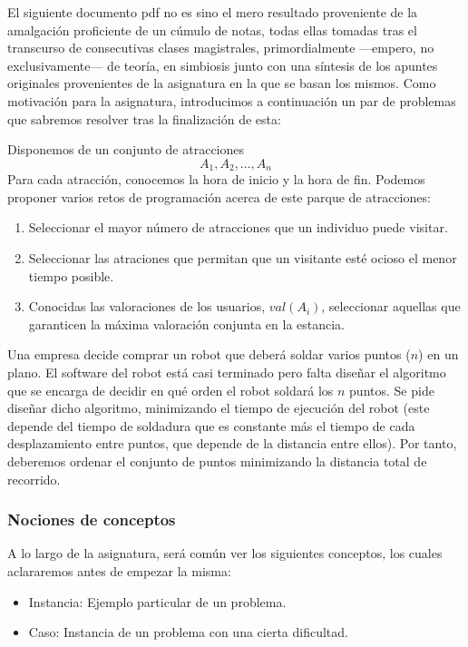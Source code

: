 El siguiente documento pdf no es sino el mero resultado proveniente de la amalgación proficiente de un cúmulo de notas, todas ellas tomadas tras el transcurso de consecutivas clases magistrales, primordialmente —empero, no exclusivamente— de teoría, en simbiosis junto con una síntesis de los apuntes originales provenientes de la asignatura en la que se basan los mismos.
Como motivación para la asignatura, introducimos a continuación un par de problemas que sabremos resolver tras la finalización de esta:

\begin{ejercicio*}
Disponemos de un conjunto de atracciones 
\[
A_1, A_2, \ldots, A_n
\]
Para cada atracción, conocemos la hora de inicio y la hora de fin. Podemos proponer varios retos de programación acerca de este parque de atracciones:
\begin{enumerate}
    \item Seleccionar el mayor número de atracciones que un individuo puede visitar.
    \item Seleccionar las atraciones que permitan que un visitante esté ocioso el menor tiempo posible.
    \item Conocidas las valoraciones de los usuarios, $val(A_i)$, seleccionar aquellas que garanticen la máxima valoración conjunta en la estancia.
\end{enumerate}
\end{ejercicio*}

\begin{ejercicio*}
Una empresa decide comprar un robot que deberá soldar varios puntos ($n$) en un plano. El software del robot está casi terminado pero falta diseñar el algoritmo que se encarga de decidir en qué orden el robot soldará los $n$ puntos. Se pide diseñar dicho algoritmo, minimizando el tiempo de ejecución del robot (este depende del tiempo de soldadura que es constante más el tiempo de cada desplazamiento entre puntos, que depende de la distancia entre ellos). Por tanto, deberemos ordenar el conjunto de puntos minimizando la distancia total de recorrido.
\end{ejercicio*}

\subsubsection{Nociones de conceptos}
A lo largo de la asignatura, será común ver los siguientes conceptos, los cuales aclararemos antes de empezar la misma:
\begin{itemize}
    \item Instancia: Ejemplo particular de un problema.
    \item Caso: Instancia de un problema con una cierta dificultad.
\end{itemize}

